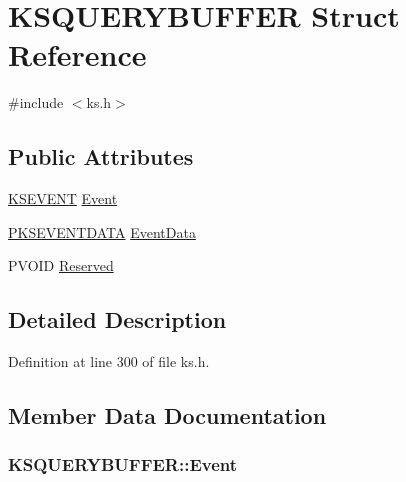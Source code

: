 \hypertarget{struct_k_s_q_u_e_r_y_b_u_f_f_e_r}{}\section{K\+S\+Q\+U\+E\+R\+Y\+B\+U\+F\+F\+ER Struct Reference}
\label{struct_k_s_q_u_e_r_y_b_u_f_f_e_r}


{\ttfamily \#include $<$ks.\+h$>$}

\subsection*{Public Attributes}
\begin{DoxyCompactItemize}
\item 
\hyperlink{ks_8h_a4ce55f771904d86bc71007c0e5876285}{K\+S\+E\+V\+E\+NT} \hyperlink{struct_k_s_q_u_e_r_y_b_u_f_f_e_r_aeb6d2387efdf8c25a071516d506db546}{Event}
\item 
\hyperlink{ks_8h_acdf8debefc842a1b698486ea446db43a}{P\+K\+S\+E\+V\+E\+N\+T\+D\+A\+TA} \hyperlink{struct_k_s_q_u_e_r_y_b_u_f_f_e_r_a4426803e6409f14dd6c88d8ff118e21d}{Event\+Data}
\item 
P\+V\+O\+ID \hyperlink{struct_k_s_q_u_e_r_y_b_u_f_f_e_r_aeca8dd5c0ecea824ec6a687d979f6c5f}{Reserved}
\end{DoxyCompactItemize}


\subsection{Detailed Description}


Definition at line 300 of file ks.\+h.



\subsection{Member Data Documentation}
\subsubsection[{\texorpdfstring{Event}{Event}}]{ K\+S\+Q\+U\+E\+R\+Y\+B\+U\+F\+F\+E\+R\+::\+Event}\hypertarget{struct_k_s_q_u_e_r_y_b_u_f_f_e_r_aeb6d2387efdf8c25a071516d506db546}{}\label{struct_k_s_q_u_e_r_y_b_u_f_f_e_r_aeb6d2387efdf8c25a071516d506db546}


